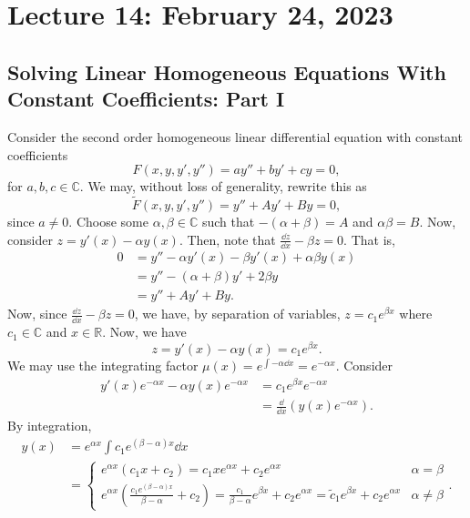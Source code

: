 \pagebreak

\section{Lecture 14: February 24, 2023}

    \subsection{Solving Linear Homogeneous Equations With Constant Coefficients: Part I}

        Consider the second order homogeneous linear differential equation with constant coefficients
        \begin{equation*}
            F(x,y,y',y'')=ay''+by'+cy=0,
        \end{equation*}
        for \(a,b,c\in\mathbb{C}\). We may, without loss of generality, rewrite this as
        \begin{equation*}
            \tilde{F}(x,y,y',y'')=y''+Ay'+By=0,
        \end{equation*}
        since \(a\neq0\). Choose some \(\alpha,\beta\in\mathbb{C}\) such that \(-(\alpha+\beta)=A\) and \(\alpha\beta=B\). Now, consider \(z=y'(x)-\alpha y(x)\). Then, note that \(\frac{\dd z}{\dd x}-\beta z=0\). That is,
        \begin{align*}
            0&=y''-\alpha y'(x)-\beta y'(x)+\alpha\beta y(x) \\
            &=y''-(\alpha+\beta)y'+2\beta y \\
            &=y''+Ay'+By.
        \end{align*}
        Now, since \(\frac{\dd z}{\dd x}-\beta z=0\), we have, by separation of variables, \(z=c_1e^{\beta x}\) where \(c_1\in\mathbb{C}\) and \(x\in\mathbb{R}\).  Now, we have
        \begin{equation*}
            z=y'(x)-\alpha y(x)=c_1e^{\beta x}.
        \end{equation*}
        We may use the integrating factor \(\mu(x)=e^{\int -\alpha \dd x}=e^{-\alpha x}\). Consider
        \begin{align*}
            y'(x)e^{-\alpha x}-\alpha y(x)e^{-\alpha x}&=c_1e^{\beta x}e^{-\alpha x} \\
            &=\frac{\dd}{\dd x}(y(x)e^{-\alpha x}).
        \end{align*}
        By integration,
        \begin{align*}
            y(x)&=e^{\alpha x}\int c_1e^{(\beta-\alpha) x} \dd x \\
            &=
            \begin{cases}
                e^{\alpha x}(c_1x+c_2)=c_1xe^{\alpha x}+c_2e^{\alpha x} & \alpha=\beta \\
                e^{\alpha x}\left(\frac{c_1e^{(\beta-\alpha)x}}{\beta-\alpha}+c_2\right)=\frac{c_1}{\beta-\alpha}e^{\beta x}+c_2e^{\alpha x}=\tilde{c}_1e^{\beta x}+c_2e^{\alpha x} & \alpha\neq\beta
            \end{cases}.
        \end{align*}
